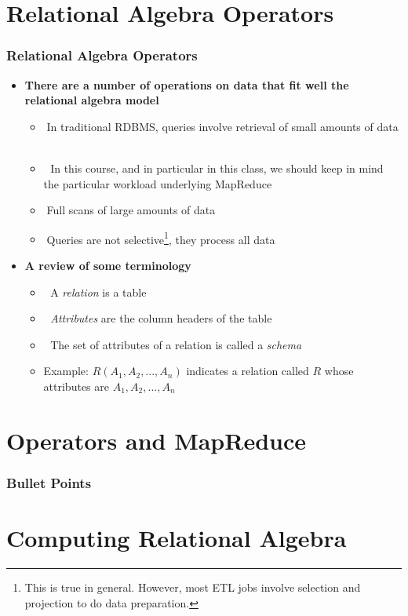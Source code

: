 \documentclass{beamer}
\newcommand{\bi}{\begin{itemize}}
\newcommand{\ei}{\end{itemize}}
\newcommand{\ii}{\item}
\begin{document}
\section{Relational Algebra Operators} 


\begin{frame}
\frametitle{Relational Algebra Operators}
\bi
\ii \textbf{There are a number of operations on data that fit well the relational algebra model}
\bi
\ii 􏰀In traditional RDBMS, queries involve retrieval of small amounts of data
􏰀\ii 􏰀 In this course, and in particular in this class, we should keep in mind the particular workload underlying MapReduce
\ii 􏰀Full scans of large amounts of data
\ii 􏰀Queries are not selective\footnote{This is true in general. However, most ETL jobs involve selection and projection to do data preparation.}, they process all data
\ei
\ii \textbf{A review of some terminology}
\bi
\ii 􏰀 A \textit{relation} is a table
\ii 􏰀 \textit{Attributes} are the column headers of the table
\ii 􏰀 The set of attributes of a relation is called a \textit{schema}
\ii Example: $R(A_1, A_2, ..., A_n)$ indicates a relation called $R$ whose attributes are $A_1, A_2, ..., A_n$
\ei
\ei
\end{frame}


\section{Operators and MapReduce} 


\begin{frame}
\frametitle{Bullet Points}

\end{frame}


\section{Computing Relational Algebra} 
\end{document}
